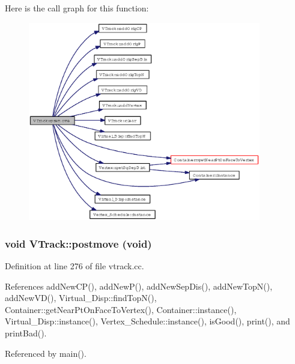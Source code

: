 Here is the call graph for this function:\begin{figure}[H]
\begin{center}
\leavevmode
\includegraphics[width=288pt]{classVTrack_517d3992d6ab6751876f2697e3ade430_cgraph}
\end{center}
\end{figure}
\subsubsection{\setlength{\rightskip}{0pt plus 5cm}void VTrack::postmove (void)}\label{classVTrack_6cc3f121ae5886b77b7b40dee5ffe05d}




Definition at line 276 of file vtrack.cc.

References add\-New\-CP(), add\-New\-P(), add\-New\-Sep\-Dis(), add\-New\-Top\-N(), add\-New\-VD(), Virtual\_\-Disp::find\-Top\-N(), Container::get\-Near\-Pt\-On\-Face\-To\-Vertex(), Container::instance(), Virtual\_\-Disp::instance(), Vertex\_\-Schedule::instance(), is\-Good(), print(), and print\-Bad().

Referenced by main().

